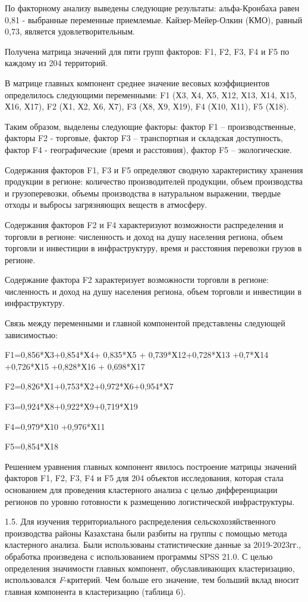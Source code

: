 \begin{multicols}{2}
По факторному анализу выведены следующие результаты: альфа-Кронбаха
равен 0,81 - выбранные переменные приемлемые. Кайзер-Мейер-Олкин (КМО),
равный 0,73, является удовлетворительным.

Получена матрица значений для пяти групп факторов: F1, F2, F3, F4 и F5
по каждому из 204 территорий.

В матрице главных компонент среднее значение весовых коэффициентов
определилось следующими переменными: F1 (Х3, Х4, Х5, Х12, Х13, Х14, Х15,
Х16, Х17), F2 (Х1, Х2, Х6, Х7), F3 (Х8, Х9, Х19), F4 (Х10, Х11), F5
(Х18).

Таким образом, выделены следующие факторы: фактор F1 --
производственные, факторы F2 - торговые, фактор F3 -- транспортная и
складская доступность, фактор F4 - географические (время и расстояния),
фактор F5 -- экологические.

Содержания факторов F1, F3 и F5 определяют сводную характеристику
хранения продукции в регионе: количество производителей продукции, объем
производства и грузоперевозки, объемы производства в натуральном
выражении, твердые отходы и выбросы загрязняющих веществ в атмосферу.

Содержания факторов F2 и F4 характеризуют возможности распределения и
торговли в регионе: численность и доход на душу населения региона, объем
торговли и инвестиции в инфраструктуру, время и расстояния перевозки
грузов в регионе.

Содержание фактора F2 характеризует возможности торговли в регионе:
численность и доход на душу населения региона, объем торговли и
инвестиции в инфраструктуру.

Связь между переменными и главной компонентой представлены следующей
зависимостью:

F1=0,856*Х3+0,854*Х4+ 0,835*Х5 + 0,739*Х12+0,728*Х13 +0,7*Х14 +0,726*Х15
+0,828*Х16 + 0,698*Х17

F2=0,826*Х1+0,753*Х2+0,972*Х6+0,954*Х7

F3=0,924*Х8+0,922*Х9+0,719*Х19

F4=0,979*Х10 +0,976*Х11

F5=0,854*Х18

Решением уравнения главных компонент явилось построение матрицы значений
факторов F1, F2, F3, F4 и F5 для 204 объектов исследования, которая
стала основанием для проведения кластерного анализа с целью
дифференциации регионов по уровню готовности к размещению логистической
инфраструктуры.

1.5. Для изучения территориального распределения сельскохозяйственного
производства районы Казахстана были разбиты на группы с помощью метода
кластерного анализа. Были использованы статистические данные за
2019-2023гг., обработка произведена с использованием программы SPSS
21.0. С целью определения значимости главных компонент, обуславливающих
кластеризацию, использовался \emph{F}-критерий. Чем больше его значение,
тем больший вклад вносит главная компонента в кластеризацию (таблица 6).
\end{multicols}

